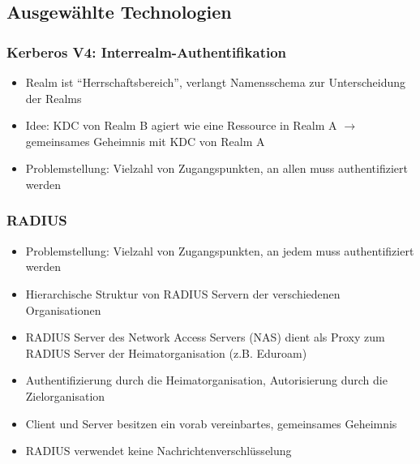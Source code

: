 \subsection{Ausgewählte Technologien}

\subsubsection{Kerberos V4: Interrealm-Authentifikation}
\begin{itemize}
	\item Realm ist "`Herrschaftsbereich"', verlangt Namensschema zur Unterscheidung der Realms
	\item Idee: KDC von Realm B agiert wie eine Ressource in Realm A $\rightarrow$ gemeinsames Geheimnis mit KDC von Realm A
	\item Problemstellung: Vielzahl von Zugangspunkten, an allen muss authentifiziert werden
\end{itemize}

\subsubsection{RADIUS}
\begin{itemize}
	\item Problemstellung: Vielzahl von Zugangspunkten, an jedem muss authentifiziert werden
	\item Hierarchische Struktur von RADIUS Servern der verschiedenen Organisationen
	\item RADIUS Server des Network Access Servers (NAS) dient als Proxy zum RADIUS Server der Heimatorganisation (z.B. Eduroam)
	\item Authentifizierung durch die Heimatorganisation, Autorisierung durch die Zielorganisation
	\item Client und Server besitzen ein vorab vereinbartes, gemeinsames Geheimnis
	\item RADIUS verwendet keine Nachrichtenverschlüsselung
\end{itemize}

